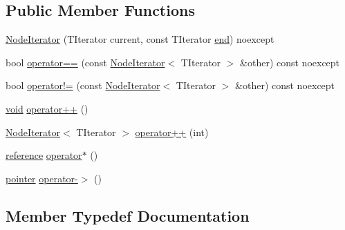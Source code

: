 \subsection*{Public Member Functions}
\begin{DoxyCompactItemize}
\item 
\mbox{\hyperlink{classonnxruntime_1_1GraphNodes_1_1NodeIterator_a038d87fb128b4326e5e8cdf95409aa55}{Node\+Iterator}} (T\+Iterator current, const T\+Iterator \mbox{\hyperlink{classonnxruntime_1_1GraphNodes_aa9426cdcde9482961f8bae49278990ad}{end}}) noexcept
\item 
bool \mbox{\hyperlink{classonnxruntime_1_1GraphNodes_1_1NodeIterator_a6223f57dd3c6ccda92a9961f2e70a1a9}{operator==}} (const \mbox{\hyperlink{classonnxruntime_1_1GraphNodes_1_1NodeIterator}{Node\+Iterator}}$<$ T\+Iterator $>$ \&other) const noexcept
\item 
bool \mbox{\hyperlink{classonnxruntime_1_1GraphNodes_1_1NodeIterator_a42301307247fac7a7888c863f734ab21}{operator!=}} (const \mbox{\hyperlink{classonnxruntime_1_1GraphNodes_1_1NodeIterator}{Node\+Iterator}}$<$ T\+Iterator $>$ \&other) const noexcept
\item 
\mbox{\hyperlink{mlasi_8h_a88f941d423cb2a819b70a1358982b1a6}{void}} \mbox{\hyperlink{classonnxruntime_1_1GraphNodes_1_1NodeIterator_ac8f1faed80f39d6f8ce45d4797957cde}{operator++}} ()
\item 
\mbox{\hyperlink{classonnxruntime_1_1GraphNodes_1_1NodeIterator}{Node\+Iterator}}$<$ T\+Iterator $>$ \mbox{\hyperlink{classonnxruntime_1_1GraphNodes_1_1NodeIterator_ae00a08e5632b7cad420182579b3df2a6}{operator++}} (int)
\item 
\mbox{\hyperlink{classonnxruntime_1_1GraphNodes_1_1NodeIterator_ad66278df7151f4ed78d6191f3483e435}{reference}} \mbox{\hyperlink{classonnxruntime_1_1GraphNodes_1_1NodeIterator_a40cd12025be279ba688d4eb372af0d03}{operator$\ast$}} ()
\item 
\mbox{\hyperlink{classonnxruntime_1_1GraphNodes_1_1NodeIterator_a66c0579aa9dea456843a9017aeae3600}{pointer}} \mbox{\hyperlink{classonnxruntime_1_1GraphNodes_1_1NodeIterator_adf6975e6a3a930c724f603b16f203630}{operator-\/$>$}} ()
\end{DoxyCompactItemize}


\subsection{Member Typedef Documentation}
\mbox{\label{classonnxruntime_1_1GraphNodes_1_1NodeIterator_ac0484990a78d9725abe1adfa1b4eb476}} 
